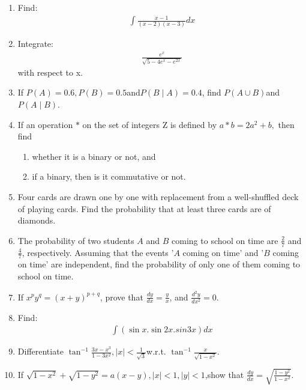 \documentclass[10pt,-letter paper]{article}
\providecommand{\brak}[1]{\ensuremath{\left(#1\right)}}
\begin{document}
\begin{enumerate}
\item Find:
\begin{align*}\int\frac{x-1}{\brak{x-2}\brak{x-3}}dx
\end{align*}

\item Integrate:
\begin{align*}\frac{e^x}{\sqrt{5-4e^x-e^{2x}}}
\end{align*} with respect to x.

\item If $P\brak{A} =0.6, P\brak{B} =0.5$and$P\brak{B\mid A} =0.4$, find $P\brak{A\cup B}$and$P\brak{A\mid B}$.

\item If an operation $\ast$ on the set of integers Z is defined by $a \ast b = 2a^{2}+b,$ then find
\begin{enumerate}
\item whether it is a binary or not, and
\item if a binary, then is it commutative or not.
\end{enumerate}

\item Four cards are drawn one by one with replacement from a well-shuffled deck of playing cards. Find the probability that at least three cards are of diamonds.

\item The probability of two students $A$ and $B$ coming to school on time are $\frac{2}{7}$ and $\frac{4}{7}$, respectively. Assuming that the events '$A$ coming on time' and '$B$ coming on time' are independent, find the probability of only one of them coming to school on time.

\item If $x^{p}y^{q}=\brak{x+y}^{p+q}$, prove that $\frac{dy}{dx}=\frac{y}{x}$, and $\frac{d^2{y}}{d{x^2}}=0$.

\item Find:
\begin{align*}\int \brak{\sin x.\sin 2x. sin 3x}dx
\end{align*}

\item Differentiate $\tan^{-1}\frac{3x-{x^3}}{1-3x^2},\vert{x}\vert<\frac{1}{\sqrt{3}}$w.r.t. $\tan^{-1}\frac{x}{\sqrt{1-x^2}}$.

\item If $\sqrt{1-x^2}+\sqrt{1-y^2}=a\brak{x-y},\vert{x}\vert<1,\vert{y}\vert <1$,show that $\frac{dy}{dx}=\sqrt{\frac{1-y^2}{1-x^2}}$.


\end{enumerate}
\end{document}
